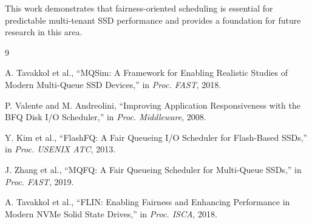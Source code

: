 \documentclass[11pt]{article}
\begin{document}
This work demonstrates that fairness-oriented scheduling is essential for predictable multi-tenant SSD performance and provides a foundation for future research in this area.

\begin{thebibliography}{9}

A. Tavakkol et al., ``MQSim: A Framework for Enabling Realistic Studies of Modern Multi-Queue SSD Devices,'' in \textit{Proc. FAST}, 2018.

P. Valente and M. Andreolini, ``Improving Application Responsiveness with the BFQ Disk I/O Scheduler,'' in \textit{Proc. Middleware}, 2008.

Y. Kim et al., ``FlashFQ: A Fair Queueing I/O Scheduler for Flash-Based SSDs,'' in \textit{Proc. USENIX ATC}, 2013.

J. Zhang et al., ``MQFQ: A Fair Queueing Scheduler for Multi-Queue SSDs,'' in \textit{Proc. FAST}, 2019.

A. Tavakkol et al., ``FLIN: Enabling Fairness and Enhancing Performance in Modern NVMe Solid State Drives,'' in \textit{Proc. ISCA}, 2018.

\end{thebibliography}
\end{document}
